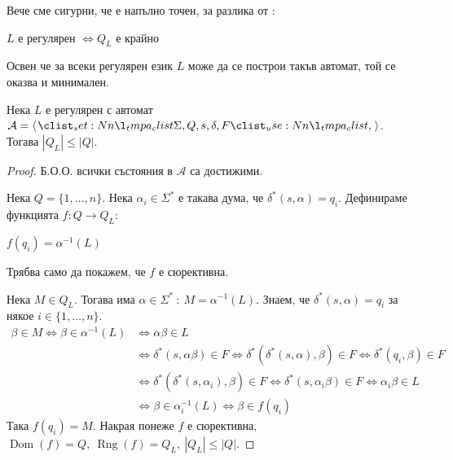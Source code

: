 Вече сме сигурни, че  е напълно точен, за разлика от :

\begin{corollary}
    $L$ е регулярен $\iff Q_L$ е крайно
\end{corollary}

Освен че за всеки регулярен език $L$ може да се построи такъв автомат, той се оказва и минимален.

\begin{claim}
    Нека $L$ е регулярен с автомат $\mathcal{A} = \opair{\Sigma, Q, s, \delta, F}$.
    Тогава $|Q_L| \leq |Q|$.
\end{claim}

\begin{proof}
    Б.О.О. всички състояния в $\mathcal{A}$ са достижими.

    Нека $Q = \{ 1, \dots, n \}$.
    Нека $\alpha_i \in \Sigma^*$ е такава дума, че $\delta^*(s, \alpha) = q_i$.
    Дефинираме функцията $f : Q \rightarrow Q_L$:
    \begin{center}
        $f(q_i) = \alpha^{-1}(L)$
    \end{center}
    Трябва само да покажем, че $f$ е сюрективна.

    Нека $M \in Q_L$.
    Тогава има $\alpha \in \Sigma^* \: : \: M = \alpha^{-1}(L)$.
    Знаем, че $\delta^*(s, \alpha) = q_i$ за някое $i \in \{ 1, \dots, n \}$.
    \begin{align*}
        \beta \in M \iff \beta \in \alpha^{-1}(L) & \iff \alpha \beta \in L                                                                                               \\
                                                  & \iff \delta^*(s, \alpha \beta) \in F \iff \delta^*(\delta^*(s, \alpha), \beta) \in F  \iff \delta^*(q_i, \beta) \in F \\
                                                  & \iff \delta^*(\delta^*(s, \alpha_i), \beta) \in F \iff \delta^*(s, \alpha_i \beta) \in F \iff \alpha_i \beta \in L    \\
                                                  & \iff \beta \in \alpha_i^{-1}(L) \iff \beta \in f(q_i)
    \end{align*}
    Така $f(q_i) = M$.
    Накрая понеже $f$ е сюрективна, $\operatorname{Dom}(f) = Q, \: \operatorname{Rng}(f) = Q_L, \: |Q_L| \leq |Q|$.
\end{proof}

